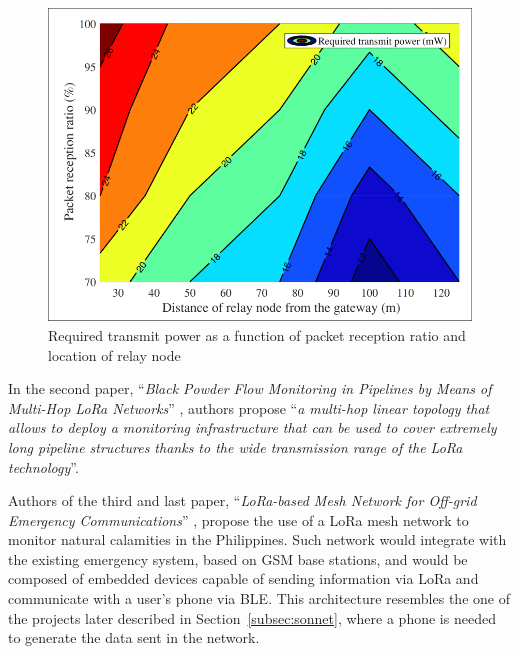 				\begin{figure}[h]
					\centering
					\includegraphics[width=.75\textwidth]{resources/img/chap4/transmit}
					\caption[Required transmit power as a function of packet reception ratio and location of relay node]{Required transmit power as a function of packet reception ratio and location of relay node \cite{8884231}}
					\label{img:transmit}
				\end{figure}
			
				In the second paper, ``\textit{Black Powder Flow Monitoring in Pipelines by Means of Multi-Hop LoRa Networks}'' \cite{8792890}, authors propose ``\textit{a multi-hop linear topology that allows to deploy a monitoring infrastructure that can be used to cover extremely long pipeline structures thanks to the wide transmission range of the LoRa technology}''.
				
				Authors of the third and last paper, ``\textit{LoRa-based Mesh Network for Off-grid Emergency Communications}'' \cite{9342944}, propose the use of a LoRa mesh network to monitor natural calamities in the Philippines.
				Such network would integrate with the existing emergency system, based on GSM base stations, and would be composed of embedded devices capable of sending information via LoRa and communicate with a user's phone via BLE.
				This architecture resembles the one of the projects later described in Section~\ref{subsec:sonnet}, where a phone is needed to generate the data sent in the network.
				


